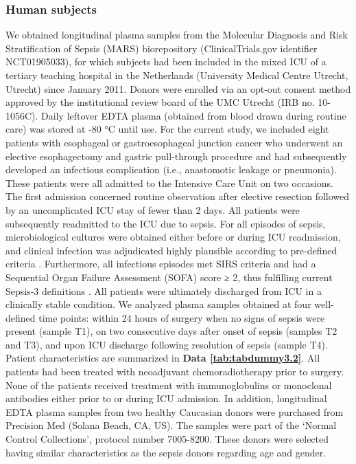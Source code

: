\subsubsection{Human subjects}
We obtained longitudinal plasma samples from the Molecular Diagnosis and Risk Stratification of Sepsis (MARS) biorepository (ClinicalTrials.gov identifier NCT01905033), for which subjects had been included in the mixed ICU of a tertiary teaching hospital in the Netherlands (University Medical Centre Utrecht, Utrecht) since January 2011. Donors were enrolled via an opt-out consent method approved by the institutional review board of the UMC Utrecht (IRB no. 10-1056C). Daily leftover EDTA plasma (obtained from blood drawn during routine care) was stored at -80 °C until use.
For the current study, we included eight patients with esophageal or gastroesophageal junction cancer who underwent an elective esophagectomy and gastric pull-through procedure and had subsequently developed an infectious complication (i.e., anastomotic leakage or pneumonia). These patients were all admitted to the Intensive Care Unit on two occasions. The first admission concerned routine observation after elective resection followed by an uncomplicated ICU stay of fewer than 2 days. All patients were subsequently readmitted to the ICU due to sepsis. For all episodes of sepsis, microbiological cultures were obtained either before or during ICU readmission, and clinical infection was adjudicated highly plausible according to pre-defined criteria \cite{klouwenberg2013interobserver}. Furthermore, all infectious episodes met SIRS criteria and had a Sequential Organ Failure Assessment (SOFA) score ≥ 2, thus fulfilling current Sepsis-3 definitions \cite{singer2016third}. All patients were ultimately discharged from ICU in a clinically stable condition. We analyzed plasma samples obtained at four well-defined time points: within 24 hours of surgery when no signs of sepsis were present (sample T1), on two consecutive days after onset of sepsis (samples T2 and T3), and upon ICU discharge following resolution of sepsis (sample T4). Patient characteristics are summarized in \textbf{Data \ref{tab:tabdummy3.2}}. All patients had been treated with neoadjuvant chemoradiotherapy prior to surgery. None of the patients received treatment with immunoglobulins or monoclonal antibodies either prior to or during ICU admission.
In addition, longitudinal EDTA plasma samples from two healthy Caucasian donors were purchased from Precision Med (Solana Beach, CA, US). The samples were part of the ‘Normal Control Collections’, protocol number 7005-8200. These donors were selected having similar characteristics as the sepsis donors regarding age and gender.

